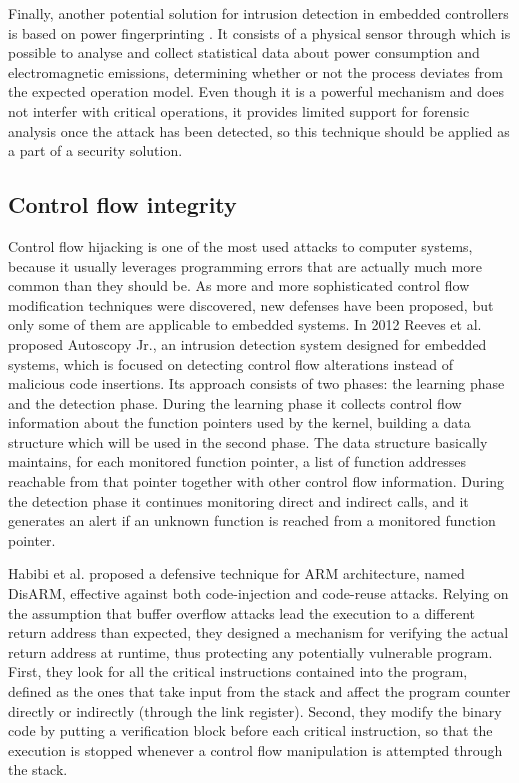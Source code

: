 Finally, another potential solution for intrusion detection in embedded controllers is based on power fingerprinting \cite{power-fingerprinting}.
It consists of a physical sensor through which is possible to analyse and collect statistical data about power consumption and electromagnetic emissions,
determining whether or not the process deviates from the expected operation model. Even though it is a powerful mechanism and does not interfer with critical operations,
it provides limited support for forensic analysis once the attack has been detected, so this technique should be applied as a part of a security solution.


\subsection{Control flow integrity}

Control flow hijacking is one of the most used attacks to computer systems, because it usually leverages programming errors that are actually much more common than they should be.
As more and more sophisticated control flow modification techniques were discovered, new defenses have been proposed, but only some of them are applicable to embedded systems.
In 2012 Reeves et al. \cite{autoscopy} proposed Autoscopy Jr., an intrusion detection system designed for embedded systems, which is focused on detecting
control flow alterations instead of malicious code insertions. Its approach consists of two phases: the learning phase and the detection phase.
During the learning phase it collects control flow information about the function pointers used by the kernel,
building a data structure which will be used in the second phase. The data structure basically maintains, for each monitored function pointer,
a list of function addresses reachable from that pointer together with other control flow information. During the detection phase it continues monitoring direct and indirect calls,
and it generates an alert if an unknown function is reached from a monitored function pointer.

Habibi et al. \cite{disarm} proposed a defensive technique for ARM architecture, named DisARM, effective against both code-injection and code-reuse attacks.
Relying on the assumption that buffer overflow attacks lead the execution to a different return address than expected,
they designed a mechanism for verifying the actual return address at runtime, thus protecting any potentially vulnerable program.
First, they look for all the critical instructions contained into the program, defined as the ones that take input from the stack
and affect the program counter directly or indirectly (\eg through the link register).
Second, they modify the binary code by putting a verification block before each critical instruction,
so that the execution is stopped whenever a control flow manipulation is attempted through the stack.

